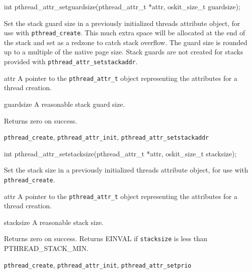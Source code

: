 \begin{apisyn}

	\funcproto int pthread_attr_setguardsize(pthread_attr_t *attr,
                                                 oskit_size_t guardsize);
\end{apisyn}
\begin{apidesc}
	Set the stack guard size in a previously initialized threads
	attribute object, for use with {\tt pthread_create}. This much
	extra space will be allocated at the end of the stack and set as a
	redzone to catch stack overflow. The guard size is rounded up to a
	multiple of the native page size. Stack guards are not created for
	stacks provided with {\tt pthread_attr_setstackaddr}.
\end{apidesc}
\begin{apiparm}
	\item[attr]
		A pointer to the {\tt pthread_attr_t} object
		representing the attributes for a thread creation.
	\item[guardsize]
		A reasonable stack guard size.
\end{apiparm}
\begin{apiret}
	Returns zero on success. 
\end{apiret}
\begin{apirel}
	{\tt pthread_create}, {\tt pthread_attr_init},
        {\tt pthread_attr_setstackaddr}
\end{apirel}


\begin{apisyn}

	\funcproto int pthread_attr_setstacksize(pthread_attr_t *attr,
                                                 oskit_size_t stacksize);
\end{apisyn}
\begin{apidesc}
	Set the stack size in a previously initialized threads
	attribute object, for use with {\tt pthread_create}. 
\end{apidesc}
\begin{apiparm}
	\item[attr]
		A pointer to the {\tt pthread_attr_t} object
		representing the attributes for a thread creation.
	\item[stacksize]
		A reasonable stack size.
\end{apiparm}
\begin{apiret}
	Returns zero on success. Returns EINVAL if {\tt stacksize} is less
	than PTHREAD_STACK_MIN.
\end{apiret}
\begin{apirel}
	{\tt pthread_create}, {\tt pthread_attr_init},
        {\tt pthread_attr_setprio}
\end{apirel}


